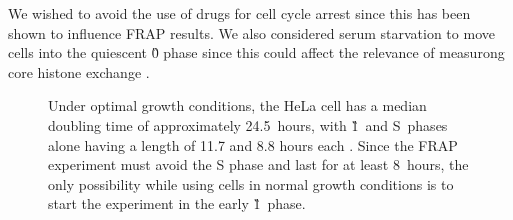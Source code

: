     We wished to avoid the use of drugs for cell cycle arrest since this has been
    shown to influence FRAP results. 
    We also considered serum starvation to move cells into the
    quiescent \G0{} phase since this could affect the relevance of measurong core histone exchange \citep{SerumStarvation} .

      \begin{figure}
        \centering
        \newcommand{\slice}[4]{
          \pgfmathparse{0.5*#1+0.5*#2}
          \let\midangle\pgfmathresult

          \draw[thick,fill=black!10] (0,0) -- (#1:1) arc (#1:#2:1) -- cycle;

          \node[label=\midangle:#4] at (\midangle:1) {};

          \pgfmathparse{min((#2-#1-10)/110*(-0.3),0)}
          \let\temp\pgfmathresult
          \pgfmathparse{max(\temp,-0.5) + 0.8}
          \let\innerpos\pgfmathresult
          \node at (\midangle:\innerpos) {#3};
        }
          {
            Under optimal growth conditions, the HeLa cell has a median
            doubling time of approximately 24.5~hours, with \G1~and
            S~phases alone having a length of 11.7 and 8.8 hours each \citep{HeLaCellCycle}.
            Since the FRAP experiment must avoid the S phase and last for
            at least 8~hours, the only possibility while using cells in normal
            growth conditions is to start the experiment in the early \G1~phase.
          }
        \label{fig:kill-frap:cell-cycle}
      \end{figure}

